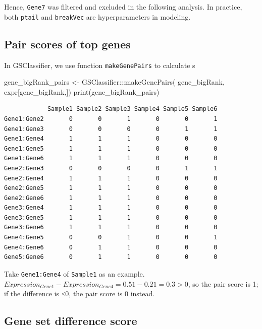 \documentclass[
]{book}
\newenvironment{Shaded}{\begin{snugshade}}{\end{snugshade}}
\newcommand{\FunctionTok}[1]{\textcolor[rgb]{0.00,0.00,0.00}{#1}}
\newcommand{\NormalTok}[1]{#1}
\newcommand{\OtherTok}[1]{\textcolor[rgb]{0.56,0.35,0.01}{#1}}
\newcommand{\SpecialCharTok}[1]{\textcolor[rgb]{0.00,0.00,0.00}{#1}}
\begin{document}
Hence, \texttt{Gene7} was filtered and excluded in the following analysis. In practice, both \texttt{ptail} and \texttt{breakVec} are hyperparameters in modeling.

\hypertarget{pair-scores-of-top-genes}{%
\subsection{Pair scores of top genes}\label{pair-scores-of-top-genes}}

In GSClassifier, we use function \texttt{makeGenePairs} to calculate s

\begin{Shaded}
\begin{Highlighting}[]
\NormalTok{gene\_bigRank\_pairs }\OtherTok{\textless{}{-}}\NormalTok{ GSClassifier}\SpecialCharTok{:::}\FunctionTok{makeGenePairs}\NormalTok{(}
\NormalTok{  gene\_bigRank, }
\NormalTok{  expr[gene\_bigRank,])}
\FunctionTok{print}\NormalTok{(gene\_bigRank\_pairs)}
\end{Highlighting}
\end{Shaded}

\begin{verbatim}
            Sample1 Sample2 Sample3 Sample4 Sample5 Sample6
Gene1:Gene2       0       0       1       0       0       1
Gene1:Gene3       0       0       0       0       1       1
Gene1:Gene4       1       1       1       0       0       0
Gene1:Gene5       1       1       1       0       0       0
Gene1:Gene6       1       1       1       0       0       0
Gene2:Gene3       0       0       0       0       1       1
Gene2:Gene4       1       1       1       0       0       0
Gene2:Gene5       1       1       1       0       0       0
Gene2:Gene6       1       1       1       0       0       0
Gene3:Gene4       1       1       1       0       0       0
Gene3:Gene5       1       1       1       0       0       0
Gene3:Gene6       1       1       1       0       0       0
Gene4:Gene5       0       0       1       0       0       1
Gene4:Gene6       0       1       1       0       0       0
Gene5:Gene6       0       1       1       0       0       0
\end{verbatim}

Take \texttt{Gene1:Gene4} of \texttt{Sample1} as an example. \(Expression_{Gene1} - Expression_{Gene4} = 0.51-0.21 = 0.3 > 0\), so the pair score is 1; if the difference is ≤0, the pair score is 0 instead.

\hypertarget{gene-set-difference-score}{%
\subsection{Gene set difference score}\label{gene-set-difference-score}}
\end{document}
